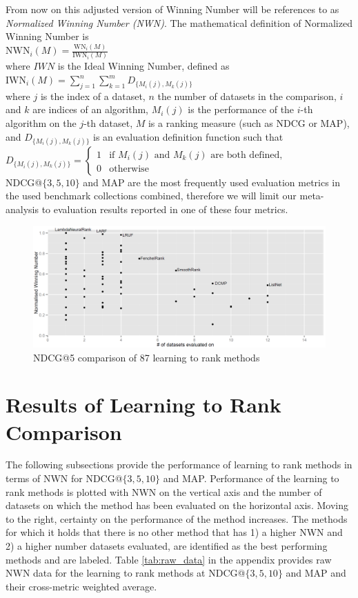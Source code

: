 \documentclass{sig-alternate}
\begin{document}
From now on this adjusted version of Winning Number will be references to as \emph{Normalized Winning Number (NWN)}. The mathematical definition of Normalized Winning Number is\\
$\text{NWN}_i(M) = \frac{\text{WN}_i(M)}{\text{IWN}_i(M)}$\\
\noindent
where $IWN$ is the Ideal Winning Number, defined as\\
$\text{IWN}_i(M) = \sum\nolimits_{j=1}^n \sum\nolimits_{k=1}^m D_{\{M_i(j),M_k(j)\}}$\\
where $j$ is the index of a dataset, $n$ the number of datasets in the comparison, $i$ and $k$ are indices of an algorithm, $M_i(j)$ is the performance of the $i$-th algorithm on the $j$-th dataset, $M$ is a ranking measure (such as NDCG or MAP), and $D_{\{M_i(j),M_k(j)\}}$ is an evaluation definition function such that\\
$D_{\{M_i(j),M_k(j)\}} = \begin{cases}
1 & \text{if } M_i(j) \text{ and } M_k(j) \text{ are both defined}, \\
0 & \text{otherwise}
\end{cases}$\\
NDCG@$\{3,5,10\}$ and MAP are the most frequently used evaluation metrics in the used benchmark collections combined, therefore we will limit our meta-analysis to evaluation results reported in one of these four metrics.

\begin{figure}
\includegraphics[scale=0.19]{gfx/ndcg5_winnum}
\caption{NDCG@5 comparison of 87 learning to rank methods}
\label{fig:normalized_winning_number_ndcg5}
\end{figure}
\section{Results of Learning to Rank Comparison}
The following subsections provide the performance of learning to rank methods in terms of NWN for NDCG@$\{3,5,10\}$ and MAP. Performance of the learning to rank methods is plotted with NWN on the vertical axis and the number of datasets on which the method has been evaluated on the horizontal axis. Moving to the right, certainty on the performance of the method increases. The methods for which it holds that there is no other method that has 1) a higher NWN and 2) a higher number datasets evaluated, are identified as the best performing methods and are labeled. Table \ref{tab:raw_data} in the appendix provides raw NWN data for the learning to rank methods at NDCG@$\{3,5,10\}$ and MAP and their cross-metric weighted average.
\end{document}
